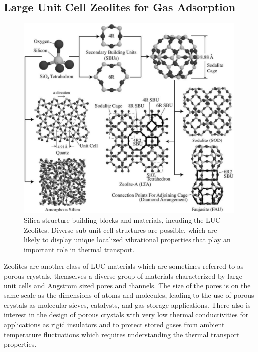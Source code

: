 \documentclass[letterpaper,12pt]{article}
\begin{document}
\subsection{\label{S-Motivation-Zeolites}Large Unit Cell Zeolites for Gas Adsorption }
\begin{figure}
\begin{center}
\includegraphics[scale=0.25]{alan_silica_structures.eps}
\vspace*{-5mm}
\end{center}
\caption{\label{FIG:silica_structures} Silica structure building blocks and materials, incuding the LUC Zeolites. Diverse sub-unit cell structures are possible, which are likely to display unique localized vibrational properties that play an important role in thermal transport.}
\end{figure}
Zeolites are another class of LUC materials which are sometimes referred to as porous crystals, themselves a diverse group of materials
characterized by large unit cells and Angstrom sized pores
and channels.\cite{mcgaughey2004b} The size of the pores is on the same scale as the
dimensions of atoms and molecules, leading to the use of porous crystals as molecular sieves, catalysts, and gas storage applications.\cite{dyer1988} There also is interest in the design of porous crystals with very low thermal conductivities for applications as rigid insulators and to protect stored gases from ambient temperature fluctuations which requires understanding the thermal transport properties.
\end{document}
